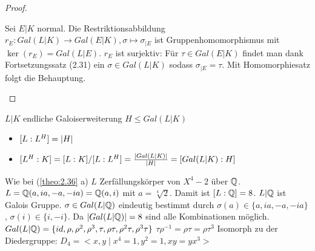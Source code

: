 \documentclass[../main.tex]{subfiles}
\begin{document}
\begin{proof}
\begin{itemize}[align= left]
    Sei $E|K$ normal.
    Die Restriktionsabbildung $r_E: Gal(L|K) \rightarrow Gal(E|K), \sigma \mapsto \sigma_{|E}$ ist Gruppenhomomorphismus mit $\ker(r_E) = Gal(L|E)$.
    $r_E$ ist surjektiv:
    Für $\tau\in Gal(E|K)$ findet man dank Fortsetzungssatz (2.31) ein $\sigma \in Gal(L|K)$ sodass $\sigma_{|E}=\tau$.
    Mit Homomorphiesatz folgt die Behauptung.
\end{itemize}
\end{proof}
\begin{remark}
    $L|K$ endliche Galoiserweiterung $H\leq Gal(L|K)$
    \begin{itemize}
        \item $[L:L^H] = \left\vert H \right\vert$
        \item $[L^H:K] = [L:K]/[L:L^H] = \frac{\left\vert Gal(L|K) \right\vert}{\left\vert H \right\vert} = [Gal(L|K):H]$
    \end{itemize}
\end{remark}
\begin{example}
    Wie bei (\cref{theo:2.36} a)
    $L$ Zerfällungskörper von $X^4-2$ über $\mathbb{Q}$.
    $L = \mathbb{Q}(a, ia, -a, -ia) = \mathbb{Q}(a,i)$ mit $a=\sqrt[4]{2}$.
    Damit ist $[L:\mathbb{Q}] = 8$.
    $L|\mathbb{Q}$ ist Galois Gruppe.
    $\sigma\in Gal(L|\mathbb{Q})$ eindeutig bestimmt durch $\sigma(a)\in \{a,ia,-a,-ia\}$, $\sigma(i)\in \{i,-i\}$.
    Da $\left\vert Gal(L|\mathbb{Q}) \right\vert = 8$ sind alle Kombinationen möglich.
    \TODO[Graphik]
    $Gal(L|\mathbb{Q}) = \{id,\rho,\rho^2,\rho^3,\tau,\rho\tau,\rho^2\tau,\rho^3\tau\}$ %
    $\tau\rho^{-1}=\rho \tau = \rho\tau^3$ %
    Isomorph zu der Diedergruppe:
    $D_4 = <x,y\mid x^4=1, y^2=1,xy=yx^3>$
\end{example}
\end{document}
